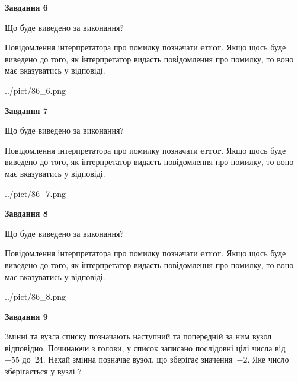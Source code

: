 \documentclass[12pt, ukrainian]{article}
\begin{document}
{\begin {large}
{\begin {center}\textbf{Завдання 6}\end {center}}\par
Що буде виведено за виконання?

Повідомлення інтерпретатора про помилку позначати \textbf{error}.
Якщо щось буде виведено до того, як інтерпретатор видасть повідомлення про помилку, 
то воно має вказуватись у відповіді. \par


\begin{center}
	{../pict/86_6.png}
\end{center}
\newpage

{\begin {center}\textbf{Завдання 7}\end {center}}\par
Що буде виведено за виконання?

Повідомлення інтерпретатора про помилку позначати \textbf{error}.
Якщо щось буде виведено до того, як інтерпретатор видасть повідомлення про помилку, 
то воно має вказуватись у відповіді. \par


\begin{center}
	{../pict/86_7.png}
\end{center}
\newpage

{\begin {center}\textbf{Завдання 8}\end {center}}\par
Що буде виведено за виконання?

Повідомлення інтерпретатора про помилку позначати \textbf{error}.
Якщо щось буде виведено до того, як інтерпретатор видасть повідомлення про помилку, 
то воно має вказуватись у відповіді. \par


\begin{center}
	{../pict/86_8.png}
\end{center}
\newpage

{\begin {center}\textbf{Завдання 9}\end {center}}\par
Змінні  та  вузла списку позначають наступний та попередній за ним вузол відповідно. Починаючи з голови, у список записано послідовні цілі числа від~$-55$ до~$24$. Нехай змінна  позначає вузол, що зберігає значення~$-2$.
Яке число зберігається у вузлі  ?\par
\newpage


\end{large}}
\end{document}
